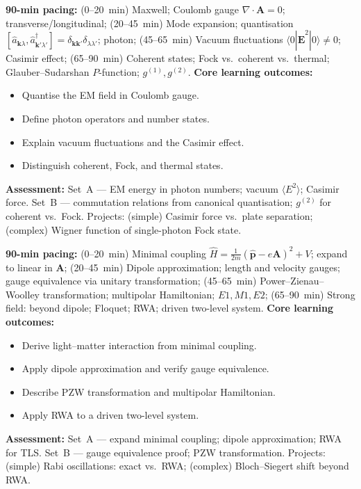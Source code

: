 \documentclass[11pt,a4paper]{article}
\begin{document}
\begin{tcolorbox}[modulebox, title={Module~II.6 --- Lecture L01: Classical and Quantum Electromagnetic Fields}]
\textbf{90-min pacing:} (0--20~min) Maxwell; Coulomb gauge $\nabla\cdot\mathbf{A}=0$; transverse/longitudinal; (20--45~min) Mode expansion; quantisation $[\hat{a}_{\mathbf{k}\lambda},\hat{a}^\dagger_{\mathbf{k}'\lambda'}]=\delta_{\mathbf{k}\mathbf{k}'}\delta_{\lambda\lambda'}$; photon; (45--65~min) Vacuum fluctuations $\langle0|\hat{\mathbf{E}}^2|0\rangle\neq0$; Casimir effect; (65--90~min) Coherent states; Fock vs.\ coherent vs.\ thermal; Glauber--Sudarshan $P$-function; $g^{(1)},g^{(2)}$.
\medskip\textbf{Core learning outcomes:}
\begin{itemize}[leftmargin=1.4em,topsep=2pt,itemsep=1pt]
  \item Quantise the EM field in Coulomb gauge.
  \item Define photon operators and number states.
  \item Explain vacuum fluctuations and the Casimir effect.
  \item Distinguish coherent, Fock, and thermal states.
\end{itemize}
\medskip\textbf{Assessment:}
Set~A --- EM energy in photon numbers; vacuum $\langle E^2\rangle$; Casimir force.
Set~B --- commutation relations from canonical quantisation; $g^{(2)}$ for coherent vs.\ Fock.
Projects: (simple) Casimir force vs.\ plate separation; (complex) Wigner function of single-photon Fock state.
\end{tcolorbox}

\medskip

\begin{tcolorbox}[modulebox, title={Module~II.6 --- Lecture L02: Light--Matter Coupling}]
\textbf{90-min pacing:} (0--20~min) Minimal coupling $\hat{H}=\tfrac{1}{2m}(\hat{\mathbf{p}}-e\mathbf{A})^2+V$; expand to linear in $\mathbf{A}$; (20--45~min) Dipole approximation; length and velocity gauges; gauge equivalence via unitary transformation; (45--65~min) Power--Zienau--Woolley transformation; multipolar Hamiltonian; $E1,M1,E2$; (65--90~min) Strong field: beyond dipole; Floquet; RWA; driven two-level system.
\medskip\textbf{Core learning outcomes:}
\begin{itemize}[leftmargin=1.4em,topsep=2pt,itemsep=1pt]
  \item Derive light--matter interaction from minimal coupling.
  \item Apply dipole approximation and verify gauge equivalence.
  \item Describe PZW transformation and multipolar Hamiltonian.
  \item Apply RWA to a driven two-level system.
\end{itemize}
\medskip\textbf{Assessment:}
Set~A --- expand minimal coupling; dipole approximation; RWA for TLS.
Set~B --- gauge equivalence proof; PZW transformation.
Projects: (simple) Rabi oscillations: exact vs.\ RWA; (complex) Bloch--Siegert shift beyond RWA.
\end{tcolorbox}
\end{document}
